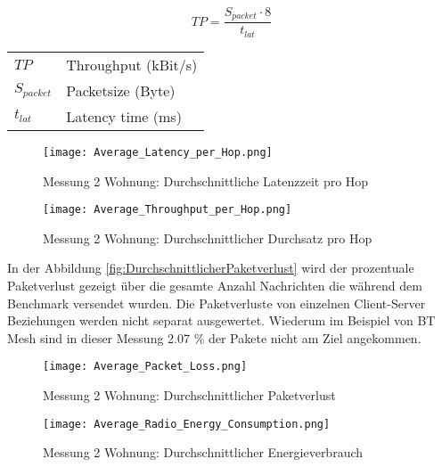 \begin{equation}\label{eq:BerechnungDurchsatz}
TP =  \frac{S_{packet} \cdot 8}{t_{lat}}
\end{equation}

\begin{small}
	\begin{center}
		\begin{tabular}{ll}
			$TP$ & Throughput (kBit/s)\\
			$S_{packet}$ & Packetsize (Byte)\\
			$t_{lat}$ & Latency time (ms)\\
		\end{tabular}
	\end{center}
\end{small}

\begin{figure}[!htbp]
	\centering
	\begin{minipage}[b]{0.49\textwidth}
		\centering
		\texttt{[image: Average\_Latency\_per\_Hop.png]}
		\caption{Messung 2 Wohnung: Durchschnittliche Latenzzeit pro Hop}
		\label{fig:DurchschnittlicheLatenzzeit}
	\end{minipage}
	\begin{minipage}[b]{0.49\textwidth}
		\centering
		\texttt{[image: Average\_Throughput\_per\_Hop.png]}
		\caption{Messung 2 Wohnung: Durchschnittlicher Durchsatz pro Hop}
		\label{fig:DurchschnittlicherDurchsatz}
	\end{minipage}
\end{figure}

In der Abbildung \ref{fig:DurchschnittlicherPaketverlust} wird der prozentuale Paketverlust gezeigt über die gesamte Anzahl Nachrichten die während dem Benchmark versendet wurden.
Die Paketverluste von einzelnen Client-Server Beziehungen werden nicht separat ausgewertet.
Wiederum im Beispiel von BT Mesh sind in dieser Messung 2.07 \% der Pakete nicht am Ziel angekommen.

\begin{figure}[!htbp]
	\centering
	\begin{minipage}[b]{0.49\textwidth}
		\centering
		\texttt{[image: Average\_Packet\_Loss.png]}
		\caption{Messung 2 Wohnung: Durchschnittlicher Paketverlust}
		\label{fig:DurchschnittlicherPaketverlust}
	\end{minipage}
	\begin{minipage}[b]{0.49\textwidth}
		\centering
		\texttt{[image: Average\_Radio\_Energy\_Consumption.png]}
		\caption{Messung 2 Wohnung: Durchschnittlicher Energieverbrauch}
		\label{fig:DurchschnittlicherEnergieverbrauch}
	\end{minipage}
\end{figure}

